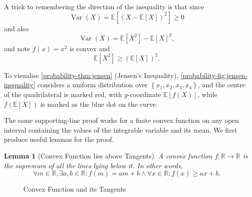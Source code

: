 \documentclass[11pt]{article}
\numberwithin{equation}{section}
\newtheorem{lemma}[theorem]{Lemma}
\theoremstyle{definition}
\theoremstyle{remark}
\newcommand{\pqty}[1]{\left(#1\right)}
\newcommand{\bqty}[1]{\left[#1\right]}
\newcommand{\Bqty}[1]{\left\{#1\right\}}
\newcommand{\functiondomain}[3]{#1:#2\to #3}
\newcommand{\RR}{\mathbb R}
\newcommand{\Expt}{\mathbb E}
\DeclareMathOperator{\Var}{Var}
\begin{document}
A trick to remembering the direction of the inequality is that since
\[
    \Var\pqty{X} = \Expt\bqty{\pqty{X - \Expt\bqty{X}}^2} \geq 0
\]
and also
\[
    \Var\pqty{X} = \Expt\bqty{X^2} - \Expt\bqty{X}^2,
\]
and note \(f\pqty{x} = x^2\) is convex and
\[
    \Expt\bqty{X^2} \geq \pqty{\Expt\bqty{X}}^2.
\]

To visualise \autoref{probability-thm:jensen} (Jensen's Inequality), \autoref{probability-fig:jensen-inequality} considers a uniform distribution over \(\Bqty{x_1, x_2, x_3, x_4}\), and the centre of the quadrilateral is marked red, with \(y\)-coordinate \(\Expt\bqty{f\pqty{X}}\), while \(f\pqty{\Expt\bqty{X}}\) is marked as the blue dot on the curve.

The same supporting-line proof works for a finite convex function on any open interval containing the values of the integrable variable and its mean. We first produce useful lemmas for the proof.

\begin{lemma}[Convex Function lies above Tangents]\label{probability-lemma-007}
    \label{probability-lem:convex-fn-tangents}%
    A convex function \(\functiondomain{f}{\RR}{\RR}\) is the supremum of all the lines lying below it. In other words,
    \[
        \forall m \in \RR, \exists a, b \in \RR: f\pqty{m} = am + b \land \forall x \in \RR: f\pqty{x} \geq ax + b.
    \]
\end{lemma}

\begin{figure}[ht!]
    \centering

    \caption{Convex Function and its Tangents}
    \label{probability-fig:convex-fn-tangents}
\end{figure}
\end{document}
